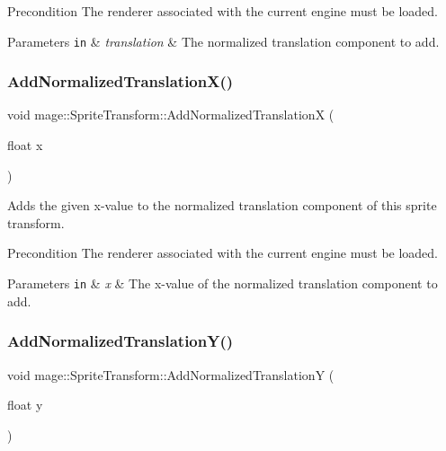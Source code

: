 \begin{DoxyPrecond}{Precondition}
The renderer associated with the current engine must be loaded. 
\end{DoxyPrecond}

\begin{DoxyParams}[1]{Parameters}
\mbox{\tt in}  & {\em translation} & The normalized translation component to add. \\
\hline
\end{DoxyParams}
\hypertarget{structmage_1_1_sprite_transform_a4db6aebc7dedf0c38599d4cb989c62fc}{}\label{structmage_1_1_sprite_transform_a4db6aebc7dedf0c38599d4cb989c62fc} 
\subsubsection{\texorpdfstring{Add\+Normalized\+Translation\+X()}{AddNormalizedTranslationX()}}
{\footnotesize\ttfamily void mage\+::\+Sprite\+Transform\+::\+Add\+Normalized\+TranslationX (\begin{DoxyParamCaption}\item[{float}]{x }\end{DoxyParamCaption})}

Adds the given x-\/value to the normalized translation component of this sprite transform.

\begin{DoxyPrecond}{Precondition}
The renderer associated with the current engine must be loaded. 
\end{DoxyPrecond}

\begin{DoxyParams}[1]{Parameters}
\mbox{\tt in}  & {\em x} & The x-\/value of the normalized translation component to add. \\
\hline
\end{DoxyParams}
\hypertarget{structmage_1_1_sprite_transform_aead38398d2cbeb60e664beb38065b6fc}{}\label{structmage_1_1_sprite_transform_aead38398d2cbeb60e664beb38065b6fc} 
\subsubsection{\texorpdfstring{Add\+Normalized\+Translation\+Y()}{AddNormalizedTranslationY()}}
{\footnotesize\ttfamily void mage\+::\+Sprite\+Transform\+::\+Add\+Normalized\+TranslationY (\begin{DoxyParamCaption}\item[{float}]{y }\end{DoxyParamCaption})}

